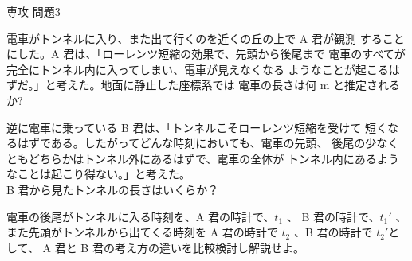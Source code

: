 \documentclass[fleqn]{jbook}
\begin{document}
\begin{question}{専攻 問題3}{}
\begin{subquestions}
\begin{subsubquestions}
  \SubSubQuestion
    電車がトンネルに入り、また出て行くのを近くの丘の上で A 君が観測
    することにした。A 君は、「ローレンツ短縮の効果で、先頭から後尾まで
    電車のすべてが完全にトンネル内に入ってしまい、電車が見えなくなる
    ようなことが起こるはずだ。」と考えた。地面に静止した座標系では
    電車の長さは何 m と推定されるか?

  \SubSubQuestion
    逆に電車に乗っている B 君は、「トンネルこそローレンツ短縮を受けて
    短くなるはずである。したがってどんな時刻においても、電車の先頭、
    後尾の少なくともどちらかはトンネル外にあるはずで、電車の全体が
    トンネル内にあるようなことは起こり得ない。」と考えた。\\
    B 君から見たトンネルの長さはいくらか？

  \SubSubQuestion
    電車の後尾がトンネルに入る時刻を、A 君の時計で、$t_1$ 、
    B 君の時計で、$t_1'$ 、また先頭がトンネルから出てくる時刻を
    A 君の時計で $t_2$ 、B 君の時計で $t_2'$として、
    A 君と B 君の考え方の違いを比較検討し解説せよ。

  \end{subsubquestions}
\end{subquestions}
\end{question}
\end{document}
